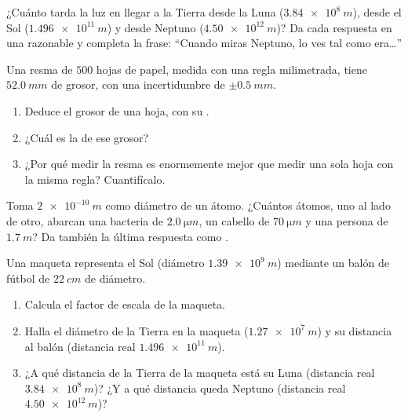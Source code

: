 \begin{exercise}[$\star\star$]\label{exo:g10:orders-of-magnitude:7}
¿Cuánto tarda la luz en llegar a la Tierra desde la Luna
($\qty{3.84e8}{m}$), desde el Sol ($\qty{1.496e11}{m}$) y desde Neptuno
($\qty{4.50e12}{m}$)? Da cada respuesta en una  razonable y
completa la frase: ``Cuando miras Neptuno, lo ves tal como era\dots''
\end{exercise}

\begin{exercise}[$\star\star$]\label{exo:g10:orders-of-magnitude:8}
Una resma de $500$ hojas de papel, medida con una regla milimetrada,
tiene $\qty{52.0}{mm}$ de grosor, con una incertidumbre de
$\pm\qty{0.5}{mm}$.
\begin{enumerate}
  \item Deduce el grosor de una hoja, con su .
  \item ¿Cuál es la  de ese grosor?
  \item ¿Por qué medir la resma es enormemente mejor que medir una sola
        hoja con la misma regla? Cuantifícalo.
\end{enumerate}
\end{exercise}

\begin{exercise}[$\star\star$]\label{exo:g10:orders-of-magnitude:9}
Toma $\qty{2e-10}{m}$ como diámetro de un átomo. ¿Cuántos átomos, uno al
lado de otro, abarcan una bacteria de $\qty{2.0}{\micro m}$, un cabello
de $\qty{70}{\micro m}$ y una persona de $\qty{1.7}{m}$? Da también la
última respuesta como .
\end{exercise}

\begin{exercise}[$\star\star$]\label{exo:g10:orders-of-magnitude:10}
Una maqueta representa el Sol (diámetro $\qty{1.39e9}{m}$) mediante un
balón de fútbol de $\qty{22}{cm}$ de diámetro.
\begin{enumerate}
  \item Calcula el factor de escala de la maqueta.
  \item Halla el diámetro de la Tierra en la maqueta
        ($\qty{1.27e7}{m}$) y su distancia al balón (distancia real
        $\qty{1.496e11}{m}$).
  \item ¿A qué distancia de la Tierra de la maqueta está su Luna
        (distancia real $\qty{3.84e8}{m}$)? ¿Y a qué distancia queda
        Neptuno (distancia real $\qty{4.50e12}{m}$)?
\end{enumerate}
\end{exercise}

